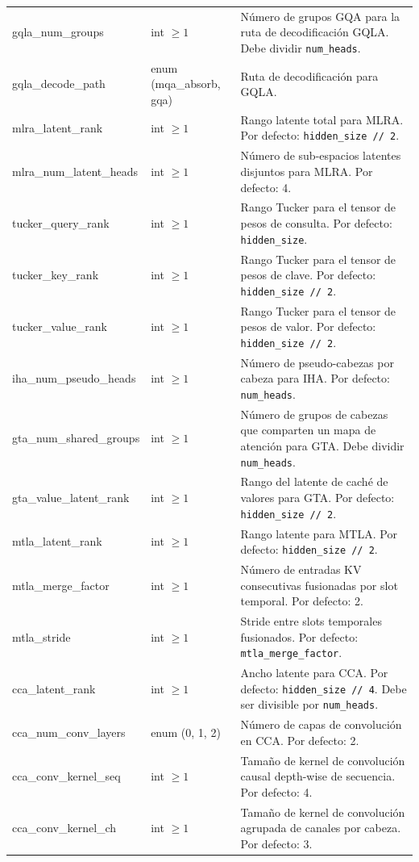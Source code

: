 \begin{longtable}{>{\ttfamily}l>{\raggedright\arraybackslash}p{3.5cm}>{\raggedright\arraybackslash}p{8.5cm}}
gqla\_num\_groups & int $\ge 1$ & Número de grupos GQA para la ruta de decodificación GQLA. Debe dividir \texttt{num\_heads}. \\
gqla\_decode\_path & enum (mqa\_absorb, gqa) & Ruta de decodificación para GQLA. \\
mlra\_latent\_rank & int $\ge 1$ & Rango latente total para MLRA. Por defecto: \texttt{hidden\_size // 2}. \\
mlra\_num\_latent\_heads & int $\ge 1$ & Número de sub-espacios latentes disjuntos para MLRA. Por defecto: 4. \\
tucker\_query\_rank & int $\ge 1$ & Rango Tucker para el tensor de pesos de consulta. Por defecto: \texttt{hidden\_size}. \\
tucker\_key\_rank & int $\ge 1$ & Rango Tucker para el tensor de pesos de clave. Por defecto: \texttt{hidden\_size // 2}. \\
tucker\_value\_rank & int $\ge 1$ & Rango Tucker para el tensor de pesos de valor. Por defecto: \texttt{hidden\_size // 2}. \\
iha\_num\_pseudo\_heads & int $\ge 1$ & Número de pseudo-cabezas por cabeza para IHA. Por defecto: \texttt{num\_heads}. \\
gta\_num\_shared\_groups & int $\ge 1$ & Número de grupos de cabezas que comparten un mapa de atención para GTA. Debe dividir \texttt{num\_heads}. \\
gta\_value\_latent\_rank & int $\ge 1$ & Rango del latente de caché de valores para GTA. Por defecto: \texttt{hidden\_size // 2}. \\
mtla\_latent\_rank & int $\ge 1$ & Rango latente para MTLA. Por defecto: \texttt{hidden\_size // 2}. \\
mtla\_merge\_factor & int $\ge 1$ & Número de entradas KV consecutivas fusionadas por slot temporal. Por defecto: 2. \\
mtla\_stride & int $\ge 1$ & Stride entre slots temporales fusionados. Por defecto: \texttt{mtla\_merge\_factor}. \\
cca\_latent\_rank & int $\ge 1$ & Ancho latente para CCA. Por defecto: \texttt{hidden\_size // 4}. Debe ser divisible por \texttt{num\_heads}. \\
cca\_num\_conv\_layers & enum (0, 1, 2) & Número de capas de convolución en CCA. Por defecto: 2. \\
cca\_conv\_kernel\_seq & int $\ge 1$ & Tamaño de kernel de convolución causal depth-wise de secuencia. Por defecto: 4. \\
cca\_conv\_kernel\_ch & int $\ge 1$ & Tamaño de kernel de convolución agrupada de canales por cabeza. Por defecto: 3. \\

\end{longtable}
